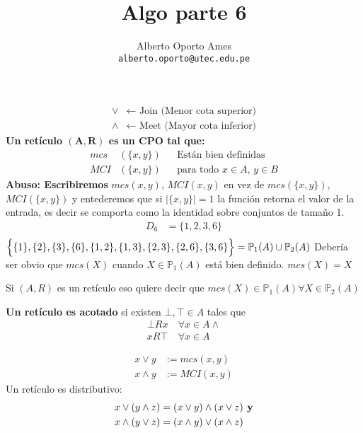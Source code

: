 \documentclass[12pt, twoside]{article}
\title{\textbf{Algo parte 6}}
\author{
		Alberto Oporto Ames\\
		\texttt{alberto.oporto@utec.edu.pe}\\
		}
\begin{document}
\maketitle
\thispagestyle{fancy}

\begin{align*}
	\vee &\longleftarrow\text{ Join (Menor cota superior)}\\
	\wedge &\longleftarrow\text{ Meet (Mayor cota inferior)}
\end{align*}
\textbf{Un retículo $\mathbf{(A,R)}$ es un $\mathbf{CPO}$ tal que:}
\begin{align*}
	mcs&(\{x,y\}) && \text{Están bien definidas}\\
	MCI&(\{x,y\}) && \text{para todo $x\in A$, $y \in B$}
\end{align*}
\textbf{Abuso: Escribiremos}
$mcs(x,y)$, $MCI(x,y)$ en vez de $mcs(\{x,y\})$, $MCI(\{x,y\})$
y entederemos que si $|\{x,y\}|=1$ la función retorna el valor de la entrada,
es decir se comporta como la identidad sobre conjuntos de tamaño 1.
\begin{align*}
	D_6 &= \{1,2,3,6\}\\
\end{align*}
$\Big{\{}\{1\},\{2\},\{3\},\{6\},\{1,2\},\{1,3\},\{2,3\},\{2,6\},\{3,6\}\Big{\}}
=\mathbb{P}_1(A)\cup\mathbb{P}_2(A)$
Debería ser obvio que $mcs(X)$ cuando $X\in \mathbb{P}_1(A)$
está bien definido.
$mcs(X)=X$

Si $(A,R)$ es un retículo eso quiere decir que $mcs(X)\in \mathbb{P}_1(A)\forall X \in
\mathbb{P}_2(A)$

\textbf{Un retículo es acotado}
si existen $\bot , \top \in A$ tales que
\begin{align*}
	\bot Rx \ &\forall x \in A\wedge\\
	xR\top \  &\forall x \in A
\end{align*}

\begin{align*}
	x\vee y &:=mcs(x,y)\\
	x\wedge y &:=MCI(x,y)
\end{align*}
Un retículo es distributivo:
\begin{align*}
	x\vee(y\wedge z) &= (x\vee y)\wedge(x\vee z) \text{\textbf{\ y}}\\
	x\wedge(y\vee z) &= (x\wedge y)\vee (x\wedge z)
\end{align*}
\end{document}
